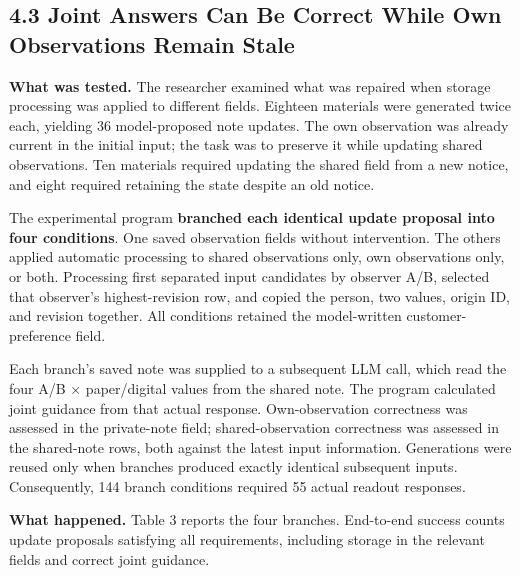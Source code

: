 \documentclass[10pt,a4paper]{article}
\begin{document}
\subsection{4.3 Joint Answers Can Be Correct While Own Observations Remain Stale}\label{two-role-failure-design-joint-answers-can-be-correct-while-own-observations-remain-stale}

\textbf{What was tested.} The researcher examined what was repaired when storage processing was applied to different fields. Eighteen materials were generated twice each, yielding 36 model-proposed note updates. The own observation was already current in the initial input; the task was to preserve it while updating shared observations. Ten materials required updating the shared field from a new notice, and eight required retaining the state despite an old notice.

The experimental program \textbf{branched each identical update proposal into four conditions}. One saved observation fields without intervention. The others applied automatic processing to shared observations only, own observations only, or both. Processing first separated input candidates by observer A/B, selected that observer's highest-revision row, and copied the person, two values, origin ID, and revision together. All conditions retained the model-written customer-preference field.

Each branch's saved note was supplied to a subsequent LLM call, which read the four A/B × paper/digital values from the shared note. The program calculated joint guidance from that actual response. Own-observation correctness was assessed in the private-note field; shared-observation correctness was assessed in the shared-note rows, both against the latest input information. Generations were reused only when branches produced exactly identical subsequent inputs. Consequently, 144 branch conditions required 55 actual readout responses.

\textbf{What happened.} Table 3 reports the four branches. End-to-end success counts update proposals satisfying all requirements, including storage in the relevant fields and correct joint guidance.
\end{document}
